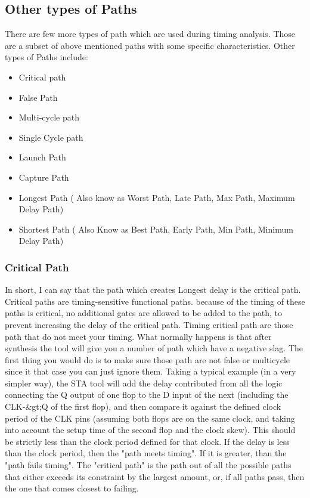 \subsection{Other types of Paths}
There are few more types of path which are used during timing analysis. Those are a subset of above mentioned paths with some specific characteristics. Other types of Paths include:
\begin{itemize}
    \item Critical path
    \item False Path
    \item Multi-cycle path
    \item Single Cycle path
    \item Launch Path
    \item Capture Path
    \item Longest Path ( Also know as Worst Path, Late Path, Max Path, Maximum Delay Path)
    \item Shortest Path ( Also Know as Best Path, Early Path, Min Path, Minimum Delay Path)
\end{itemize}

\iffalse
\subsubsection{Critical Path}
In short, I can say that the path which creates Longest delay is the critical path.
Critical paths are timing-sensitive functional paths. because of the timing of these paths is critical, no additional gates are allowed to be added to the path, to prevent increasing the delay of the critical path.
Timing critical path are those path that do not meet your timing. What normally happens is that after synthesis the tool will give you a number of path which have a negative slag. The first thing you would do is to make sure those path are not false or multicycle since it that case you can just ignore them.
Taking a typical example (in a very simpler way), the STA tool will add the delay contributed from all the logic connecting the Q output of one flop to the D input of the next (including the CLK-&gt;Q of the first flop), and then compare it against the defined clock period of the CLK pins (assuming both flops are on the same clock, and taking into account the setup time of the second flop and the clock skew). This should be strictly less than the clock period defined for that clock. If the delay is less than the clock period, then the "path meets timing". If it is greater, than the "path fails timing". The "critical path" is the path out of all the possible paths that either exceeds its constraint by the largest amount, or, if all paths pass, then the one that comes closest to failing.


